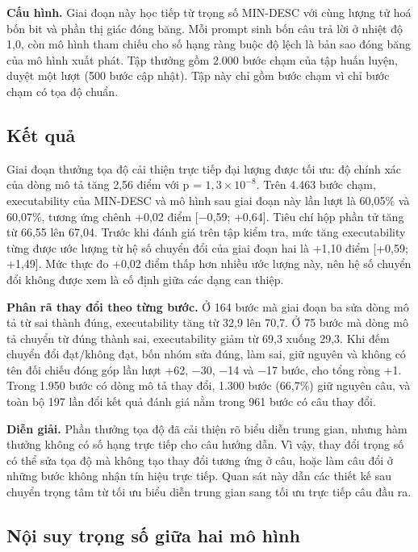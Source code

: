 \textbf{Cấu hình.} Giai đoạn này học tiếp từ trọng số MIN-DESC với cùng lượng tử hoá bốn bit và phần thị giác đóng băng. Mỗi prompt sinh bốn câu trả lời ở nhiệt độ 1,0, còn mô hình tham chiếu cho số hạng ràng buộc độ lệch là bản sao đóng băng của mô hình xuất phát. Tập thưởng gồm 2.000 bước chạm của tập huấn luyện, duyệt một lượt (500 bước cập nhật). Tập này chỉ gồm bước chạm vì chỉ bước chạm có tọa độ chuẩn.

\subsection{Kết quả}\label{sec:A.4.2}

Giai đoạn thưởng tọa độ cải thiện trực tiếp đại lượng được tối ưu: độ chính xác của dòng mô tả tăng 2,56 điểm với p = $1{,}3 \times 10^{-8}$. Trên 4.463 bước chạm, executability của MIN-DESC và mô hình sau giai đoạn này lần lượt là 60,05\% và 60,07\%, tương ứng chênh +0,02 điểm [$-$0,59; +0,64]. Tiêu chí hộp phần tử tăng từ 66,55 lên 67,04. Trước khi đánh giá trên tập kiểm tra, mức tăng executability từng được ước lượng từ hệ số chuyển đổi của giai đoạn hai là +1,10 điểm [+0,59; +1,49]. Mức thực đo +0,02 điểm thấp hơn nhiều ước lượng này, nên hệ số chuyển đổi không được xem là cố định giữa các dạng can thiệp.

\textbf{Phân rã thay đổi theo từng bước.} Ở 164 bước mà giai đoạn ba sửa dòng mô tả từ sai thành đúng, executability tăng từ 32,9 lên 70,7. Ở 75 bước mà dòng mô tả chuyển từ đúng thành sai, executability giảm từ 69,3 xuống 29,3. Khi đếm chuyển đổi đạt/không đạt, bốn nhóm sửa đúng, làm sai, giữ nguyên và không có tên đối chiếu đóng góp lần lượt +62, $-$30, $-$14 và $-$17 bước, cho tổng ròng +1. Trong 1.950 bước có dòng mô tả thay đổi, 1.300 bước (66,7\%) giữ nguyên câu, và toàn bộ 197 lần đổi kết quả đánh giá nằm trong 961 bước có câu thay đổi.

\textbf{Diễn giải.} Phần thưởng tọa độ đã cải thiện rõ biểu diễn trung gian, nhưng hàm thưởng không có số hạng trực tiếp cho câu hướng dẫn. Vì vậy, thay đổi trọng số có thể sửa tọa độ mà không tạo thay đổi tương ứng ở câu, hoặc làm câu đổi ở những bước không nhận tín hiệu trực tiếp. Quan sát này dẫn các thiết kế sau chuyển trọng tâm từ tối ưu biểu diễn trung gian sang tối ưu trực tiếp câu đầu ra.

\subsection{Nội suy trọng số giữa hai mô hình}\label{sec:A.4.3}

